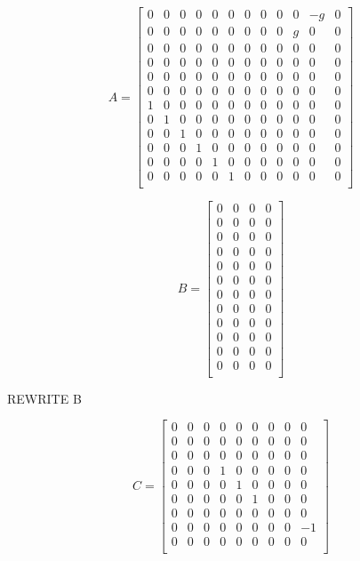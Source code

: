 \begin{equation}
 	A=\begin{bmatrix}
 	0 & 0 & 0 & 0 & 0 & 0 & 0 & 0 & 0 & 0 & -g & 0 \\
 	0 & 0 & 0 & 0 & 0 & 0 & 0 & 0 & 0 & g & 0 & 0 \\
 	0 & 0 & 0 & 0 & 0 & 0 & 0 & 0 & 0 & 0 & 0 & 0 \\
 	0 & 0 & 0 & 0 & 0 & 0 & 0 & 0 & 0 & 0 & 0 & 0 \\
 	0 & 0 & 0 & 0 & 0 & 0 & 0 & 0 & 0 & 0 & 0 & 0 \\
 	0 & 0 & 0 & 0 & 0 & 0 & 0 & 0 & 0 & 0 & 0 & 0 \\
 	1 & 0 & 0 & 0 & 0 & 0 & 0 & 0 & 0 & 0 & 0 & 0 \\
 	0 & 1 & 0 & 0 & 0 & 0 & 0 & 0 & 0 & 0 & 0 & 0 \\
 	0 & 0 & 1 & 0 & 0 & 0 & 0 & 0 & 0 & 0 & 0 & 0 \\
 	0 & 0 & 0 & 1 & 0 & 0 & 0 & 0 & 0 & 0 & 0 & 0 \\
 	0 & 0 & 0 & 0 & 1 & 0 & 0 & 0 & 0 & 0 & 0 & 0 \\
 	0 & 0 & 0 & 0 & 0 & 1 & 0 & 0 & 0 & 0 & 0 & 0 \\
 	\end{bmatrix}
 \end{equation}
 
 \begin{equation}
 	B=\begin{bmatrix}
 	0 & 0 & 0 & 0 \\
 	0 & 0 & 0 & 0 \\
 	0 & 0 & 0 & 0 \\
 	0 & 0 & 0 & 0 \\
 	0 & 0 & 0 & 0 \\
 	0 & 0 & 0 & 0 \\
 	0 & 0 & 0 & 0 \\
 	0 & 0 & 0 & 0 \\
 	0 & 0 & 0 & 0 \\
 	0 & 0 & 0 & 0 \\
 	0 & 0 & 0 & 0 \\
 	0 & 0 & 0 & 0 \\
 	\end{bmatrix}
 \end{equation}
 
REWRITE B 
 
 \begin{equation}
 	C=\begin{bmatrix}
 	0 & 0 & 0 & 0 & 0 & 0 & 0 & 0 & 0 \\
 	0 & 0 & 0 & 0 & 0 & 0 & 0 & 0 & 0 \\
 	0 & 0 & 0 & 0 & 0 & 0 & 0 & 0 & 0 \\
 	0 & 0 & 0 & 1 & 0 & 0 & 0 & 0 & 0 \\
 	0 & 0 & 0 & 0 & 1 & 0 & 0 & 0 & 0 \\
 	0 & 0 & 0 & 0 & 0 & 1 & 0 & 0 & 0 \\
 	0 & 0 & 0 & 0 & 0 & 0 & 0 & 0 & 0 \\
 	0 & 0 & 0 & 0 & 0 & 0 & 0 & 0 & -1 \\
 	0 & 0 & 0 & 0 & 0 & 0 & 0 & 0 & 0 \\
 	\end{bmatrix}
 \end{equation}
 

